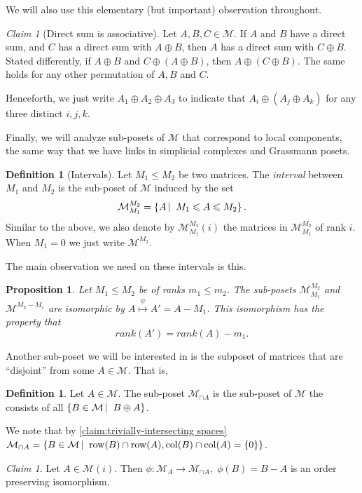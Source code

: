 \documentclass[10pt,a4paper]{article}
\newcommand{\prettyref}[1]{\cref{#1}}
\newtheorem{proposition}[theorem]{Proposition}
\theoremstyle{definition}
\newtheorem{definition}[theorem]{Definition}
\theoremstyle{remark}
\newtheorem{claim}[theorem]{Claim}
\newcommand\sett[2]{\left\{ #1 \left| \; \vphantom{#1 #2} \right. #2  \right\}}
\newcommand{\set}[1]{\{#1\}}
\DeclareMathOperator{\row}{row}
\DeclareMathOperator{\col}{col}
\renewcommand{\leq}{\leqslant}
\numberwithin{equation}{section}
\let\pref=\prettyref
\def\MP{\mathcal{M}}
\begin{document}
We will also use this elementary (but important) observation throughout.
\begin{claim}[Direct sum is associative] \label{claim:three-term-direct-sum}
    Let \(A,B,C \in \MP\). If \(A\) and \(B\) have a direct sum, and \(C\) has a direct sum with \(A \oplus B\), then \(A\) has a direct sum with \(C \oplus B\). Stated differently, if \(A \oplus B\) and \(C \oplus (A \oplus B)\), then \(A \oplus (C \oplus B)\). The same holds for any other permutation of \(A,B\) and \(C\).
\end{claim}
Henceforth, we just write \(A_1 \oplus A_2 \oplus A_3\) to indicate that \(A_i \oplus (A_j \oplus A_k)\) for any three distinct \(i,j,k\).

Finally, we will analyze sub-posets of \(\MP\) that correspond to local components, the same way that we have links in simplicial complexes and Grassmann posets.
\begin{definition}[Intervals]
    Let \(M_1 \leq M_2\) be two matrices. The \emph{interval} between \(M_1\) and \(M_2\) is the sub-poset of \(\MP\) induced by the set 
    \[\MP_{M_1}^{M_2} = \sett{A}{M_1 \leq A \leq M_2}.\]
    Similar to the above, we also denote by \(\MP_{M_1}^{M_2}(i)\) the matrices in \(\MP_{M_1}^{M_2}\) of rank \(i\). When \(M_1 = 0\) we just write \(\MP^{M_2}\).
\end{definition}

The main observation we need on these intervals is this.
\begin{proposition} \label{prop:iso-of-posets}
    Let \(M_1 \leq M_2\) be of ranks \(m_1 \leq m_2\). The sub-posets \(\MP_{M_1}^{M_2}\) and \(\MP^{M_2-M_1}\) are isomorphic by \(A \overset{\psi}{\mapsto} A' = A - M_1\). This isomorphism has the property that
        \[rank(A') = rank(A) - m_1.\]
\end{proposition}

Another sub-poset we will be interested in is the subposet of matrices that are ``disjoint'' from some \(A \in \MP\). That is,
\begin{definition}
    Let \(A \in \MP\). The sub-poset \(\MP_{\cap A}\) is the sub-poset of \(\MP\) the consists of all \(\sett{B \in \MP}{B \oplus A}\).
\end{definition}
We note that by \pref{claim:trivially-intersecting spaces} \(\MP_{\cap A} = \sett{B \in \MP}{\row(B) \cap \row(A), \col(B) \cap \col(A) = \set{0}}\).
\begin{claim} \label{claim:iso-second-type-of-lower-loc}
    Let \(A \in \MP(i)\). Then \(\phi: \MP_{A} \to \MP_{\cap A}, \; \phi(B)=B-A\) is an order preserving isomorphism.
\end{claim}
\end{document}
